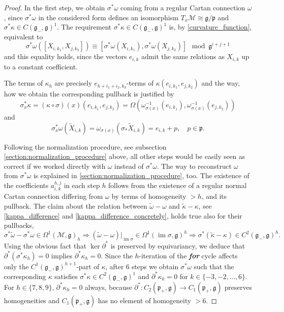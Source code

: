 \documentclass{amsart}
\theoremstyle{plain}
\theoremstyle{definition}
\theoremstyle{remark}
\newcommand{\mc}[1]{\mathcal{#1}}
\newcommand{\mfk}[1]{\mathfrak{#1}}
\newcommand{\on}[1]{\operatorname{#1}}
\begin{document}
\begin{proof}
    In the first step, we obtain $\sigma^* \omega$ coming from a regular Cartan connection $\omega$, since $\sigma^* \omega$ in the considered form defines an isomorphism $T_x\mc{M} \cong \mfk{g}/\mfk{p}$ and $\sigma^*\kappa \in C(\mfk{g}_-,\mfk{g})^1$. The requirement $\sigma^*\kappa \in C(\mfk{g}_-,\mfk{g})^1$ is, by \eqref{curvature_function}, equivalent to
    \[ \sigma^*\omega ([X_{i,k_1}, X_{j,k_2}]) \equiv [\sigma^*\omega (X_{i,k_1}), \sigma^*\omega(X_{j,k_2})] \mod \mfk{g}^{i+j+1} \]
    and this equality holds, since the vectors $e_{i,k}$ admit the same relations as $X_{i,k}$ up to a constant coefficient.

    The terms of $\kappa_h$ are precisely $e_{h+i_1+i_2,k_3}$-terms of $\kappa(e_{i,k_1}, e_{j,k_2})$ and the way, how we obtain the corresponding pullback is justified by
    \[ \sigma_x^*\kappa = (\kappa \circ \sigma)(x)(e_{i,k_1}, e_{j,k_2}) = \Omega(\omega_{\sigma(x)}^{-1}(e_{i,k_1}), \omega_{\sigma(x)}^{-1}(e_{j,k_2})) \]
    and
    \[ \sigma_x^*\omega \left(\widetilde{X}_{i,k}\right) = \omega_{\sigma(x)}\left( \sigma_* \widetilde{X}_{i,k}\right) = e_{i,k} + p, \quad p \in\mfk{p}.\]
    
    Following the normalization procedure, see subsection \ref{section:normalization_procedure} above, all other steps would be easily seen as correct if we worked directly with $\omega$ instead of $\sigma^*\omega$. The way to reconstruct $\omega$ from $\sigma^*\omega$ is explained in \ref{section:normalization_procedure}, too. The existence of the coefficients $a_{i,k}^{h,j}$ in each step $h$ follows from the existence of a regular normal Cartan connection differing from $\omega$ by terms of homogeneity $> h$, and its pullback. The claim about the relation between $\widetilde\omega-\omega$ and $\widetilde\kappa-\kappa$, see \eqref{kappa_difference} and \eqref{kappa_difference_concretely}, holds true also for their pullbacks,
    \[ \sigma^*\widetilde\omega - \sigma^* \omega \in \Omega^1 (\mc{M},\mfk{g})_h
    \Rightarrow (\widetilde\omega - \omega)\big|_{\on{im} \sigma} \in \Omega^1 (\on{im} \sigma, \mfk{g})^h
    \Rightarrow \sigma^* (\widetilde\kappa - \kappa) \in C^2 (\mfk{g}_-, \mfk{g})^h. \]
    Using the obvious fact that $\ker \partial^*$ is preserved by equivariancy, we deduce that $\partial^*\left(\sigma^*\kappa_h\right) = 0$ implies $\partial^*\kappa_h = 0$. Since the $h$-iteration of the \textbf{\em for} cycle affects only the $C^1(\mfk{g}_-, \mfk{g})^{h+1}$-part of $\kappa$, after $6$ steps we obtain $\sigma^*\omega$ such that the corresponding $\kappa$ satisfies $\sigma^*\kappa \in C^2(\mfk{g}_-,\mfk{g})^1$ and $\partial^*\kappa_k = 0$ for $k\in\{-3, -2, \dots, 6\}$. For $h \in \{7,8,9\}$, $\partial^*\kappa_h=0$ always, because $\partial^*\colon C_2(\mfk{p}_+,\mfk{g}) \to C_1(\mfk{p}_+,\mfk{g})$ preserves homogeneities and $C_1(\mfk{p}_+,\mfk{g})$ has no element of homogeneity $>6$.
\end{proof}
\end{document}
